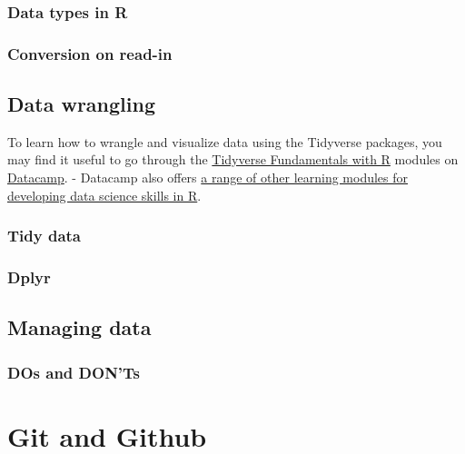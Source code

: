 \documentclass[
]{book}
\begin{document}
\hypertarget{data-types-in-r}{%
\subsection{Data types in R}\label{data-types-in-r}}

\hypertarget{conversion-on-read-in}{%
\subsection{Conversion on read-in}\label{conversion-on-read-in}}

\hypertarget{data-wrangling}{%
\section{Data wrangling}\label{data-wrangling}}

To learn how to wrangle and visualize data using the Tidyverse packages, you may find it useful to go through the \href{https://learn.datacamp.com/skill-tracks/tidyverse-fundamentals}{Tidyverse Fundamentals with R} modules on \href{https://learn.datacamp.com/}{Datacamp}.
- Datacamp also offers \href{https://learn.datacamp.com/career-tracks/data-scientist-with-r}{a range of other learning modules for developing data science skills in R}.

\hypertarget{tidy-data}{%
\subsection{Tidy data}\label{tidy-data}}

\hypertarget{dplyr}{%
\subsection{Dplyr}\label{dplyr}}

\hypertarget{managing-data}{%
\section{Managing data}\label{managing-data}}

\hypertarget{dos-and-donts}{%
\subsection{DOs and DON'Ts}\label{dos-and-donts}}

\hypertarget{git-and-github-1}{%
\chapter{Git and Github}\label{git-and-github-1}}
\end{document}
